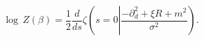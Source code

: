 \begin{equation}
\log \, Z\left(\beta \right)=\frac{1}{2}\frac{d}{ds}\zeta \left(s=0\left|
\frac{-\partial _{d}^{2}+\xi R+m^{2}}{\sigma ^{2}}\right.\right).
\label{partion function I}\end{equation}

